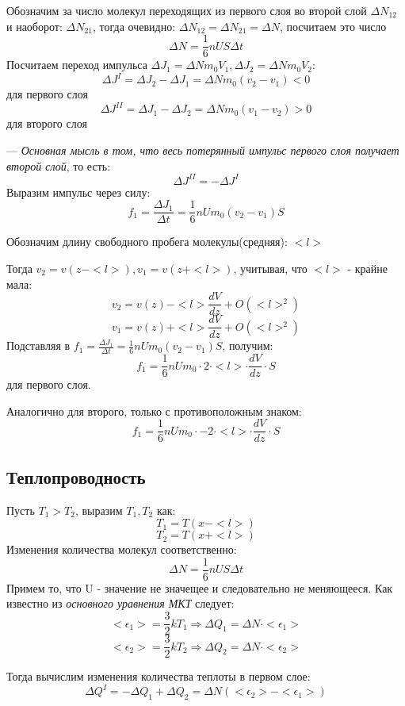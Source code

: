 \documentclass[12pt,a4paper]{report}
\begin{document}
\vspace{5px}

Обозначим за число молекул переходящих из первого слоя во второй слой $\Delta N_{12}$ и наоборот: $\Delta N_{21}$, тогда очевидно: $\Delta N_{12} = \Delta N_{21} = \Delta N$, посчитаем это число
\[\Delta N = \frac{1}{6} n U S \Delta t\]
Посчитаем переход импульса $\Delta J_1 = \Delta N m_0V_1 , \Delta J_2 = \Delta N m_0V_2$:
\[\Delta J^{I} = \Delta J_2 - \Delta J_1 = \Delta N m_0(v_2 - v_1) < 0\]
для первого слоя
\newpage
\[\Delta J^{II} = \Delta J_1 - \Delta J_2 = \Delta N m_0(v_1 - v_2) > 0\]
для второго слоя

\vspace{5px}

--- \textit{Основная мысль в том, что  весь потерянный импульс первого слоя получает второй слой}, то есть:
\[\Delta J^{II} = -\Delta J^{I}\]
Выразим импульс через силу:
\[f_1 = \frac{\Delta J_1}{\Delta t} = \frac{1}{6}nUm_0(v_2 - v_1)S\]

Обозначим длину свободного пробега молекулы(средняя): $<l>$

\vspace{5px}

Тогда $v_2 = v(z - <l>), v_1 = v(z + <l>)$, учитывая, что $<l>$ - крайне мала:
\[v_2 = v(z) - <l>\frac{dV}{dz} + O(<l>^2)\]
\[v_1 = v(z) + <l>\frac{dV}{dz} + O(<l>^2)\]
Подставляя в $f_1 = \frac{\Delta J_1}{\Delta t} = \frac{1}{6}nUm_0(v_2 - v_1)S$, получим:
\[f_1 = \frac{1}{6}nUm_0 \cdot 2 \cdot <l> \cdot \frac{dV}{dz} \cdot S\]
для первого слоя.

\vspace{5px}

Аналогично для второго, только с противоположным знаком:
\[f_1 = \frac{1}{6}nUm_0 \cdot -2 \cdot <l> \cdot \frac{dV}{dz} \cdot S\]

\subsection{Теплопроводность}
Пусть $T_1 > T_2$, выразим $T_1, T_2$ как:
\[T_1 = T(x - <l>)\]
\[T_2 = T(x+<l>)\]
Изменения количества молекул соответственно:
\[\Delta N = \frac{1}{6}nUS\Delta t\]
Примем то, что U - значение не значещее и следовательно не меняющееся. Как известно из \textit{основного уравнения МКТ} следует:
\[<\epsilon_1> = \frac{3}{2}kT_1 \Rightarrow \Delta Q_1 = \Delta N \cdot <\epsilon_1>\]
\[<\epsilon_2> = \frac{3}{2}kT_2 \Rightarrow \Delta Q_2 = \Delta N \cdot <\epsilon_2>\]

Тогда вычислим изменения количества теплоты в первом слое:
\[ \Delta Q ^{I} = -\Delta Q_1 + \Delta Q_2 = \Delta N(<\epsilon_2> - <\epsilon_1>)\]
\end{document}
